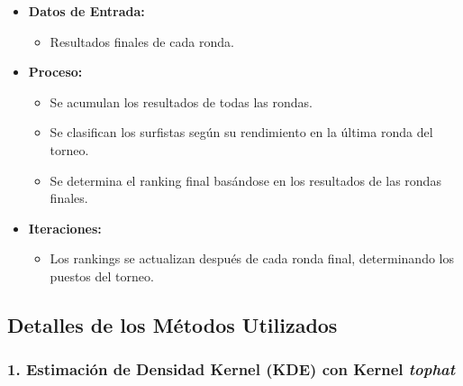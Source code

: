 \documentclass[12pt]{article}
\begin{document}
\begin{itemize}
    \item \textbf{Datos de Entrada:}
        \begin{itemize}
            \item Resultados finales de cada ronda.
        \end{itemize}
    \item \textbf{Proceso:}
        \begin{itemize}
            \item Se acumulan los resultados de todas las rondas.
            \item Se clasifican los surfistas según su rendimiento en la última ronda del torneo.
            \item Se determina el ranking final basándose en los resultados de las rondas finales.
        \end{itemize}
    \item \textbf{Iteraciones:}
        \begin{itemize}
            \item Los rankings se actualizan después de cada ronda final, determinando los puestos del torneo.
        \end{itemize}
\end{itemize}

\subsection*{Detalles de los Métodos Utilizados}

\subsubsection*{1. Estimación de Densidad Kernel (KDE) con Kernel \textit{tophat}}
\end{document}
